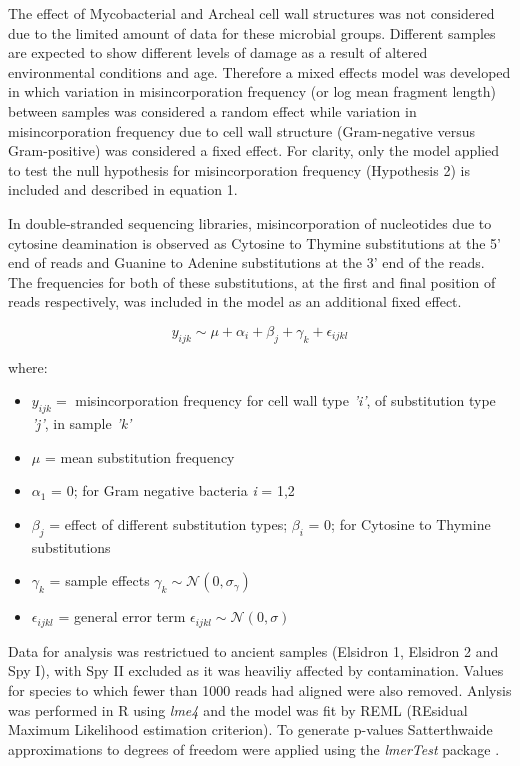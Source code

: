 \documentclass[12pt, a4paper]{article}
\begin{document}
The effect of Mycobacterial and Archeal cell wall structures was not considered due to the limited amount of data for these microbial groups.
Different samples are expected to show different levels of damage as a result of altered environmental conditions and age. 
Therefore a mixed effects model was developed in which variation in misincorporation frequency (or log mean fragment length) between samples was considered a random effect while variation in misincorporation frequency due to cell wall structure (Gram-negative versus Gram-positive) was considered a fixed effect. 
For clarity, only the model applied to test the null hypothesis for misincorporation frequency (Hypothesis 2) is included and described in equation 1.

In double-stranded sequencing libraries, misincorporation of nucleotides due to cytosine deamination is observed as Cytosine to Thymine substitutions at the 5' end of reads and Guanine to Adenine substitutions at the 3' end of the reads. The frequencies for both of these substitutions, at the first and final position of reads respectively, was included in the model as an additional fixed effect.

\begin{equation}
y_{ijk} \sim \mu + \alpha_{i} + \beta_{j} + \gamma_{k} + \epsilon_{ijkl}
\end{equation}

where:

\begin{itemize}
\item $y_{ijk} = $ misincorporation frequency for cell wall type \textit{'i'}, of substitution type \textit{'j'}, in sample \textit{'k'}
\item $\mu$ = mean substitution frequency
\item $\alpha_{1}$ = 0; for Gram negative bacteria \textit{i} = 1,2
\item $\beta_j$ = effect of different substitution types; $\beta_i$ = 0; for Cytosine to Thymine substitutions
\item $\gamma_k$ = sample effects $\gamma_k \sim \mathcal{N}\left(0,\sigma_{\gamma}\right)$
\item $\epsilon_{ijkl}$ = general error term $\epsilon_{ijkl} \sim \mathcal{N}\left(0,\sigma\right)$
\end{itemize}

Data for analysis was restrictued to ancient samples (Elsidron 1, Elsidron 2 and Spy I), with Spy II excluded as it was heaviliy affected by contamination. 
Values for species to which fewer than 1000 reads had aligned were also removed.
Anlysis was performed in R \cite[Version 3.3.2]{R-Core-Team:2016aa} using \textit{lme4} \cite[Version 1.1-12]{Bates:2015aa} and the model was fit by REML (REsidual Maximum Likelihood estimation criterion). To generate p-values Satterthwaide approximations to degrees of freedom were applied using the \textit{lmerTest} package \cite[version 2.0-33]{Kuznetsova:2016aa}.
\end{document}

